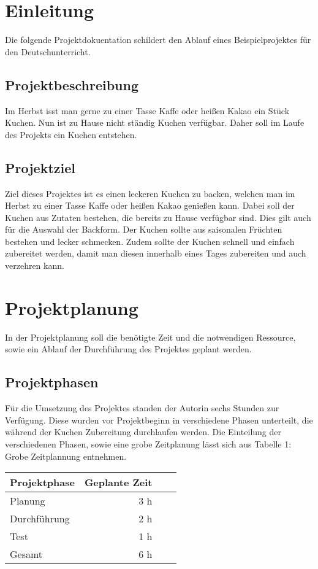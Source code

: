 \section{Einleitung}
Die folgende Projektdokuentation schildert den Ablauf eines Beispielprojektes für den Deutschunterricht.
\subsection{Projektbeschreibung}
Im Herbst isst man gerne zu einer Tasse Kaffe oder heißen Kakao ein Stück Kuchen. Nun ist zu Hause nicht ständig Kuchen verfügbar. Daher soll im Laufe des Projekts
ein Kuchen entstehen.
\subsection{Projektziel}
Ziel dieses Projektes ist es einen leckeren Kuchen zu backen, welchen man im Herbst zu einer Tasse Kaffe oder heißen Kakao genießen kann.
Dabei soll der Kuchen aus Zutaten bestehen, die bereits zu Hause verfügbar sind. Dies gilt auch für die Auswahl der Backform.
Der Kuchen sollte aus saisonalen Früchten bestehen und lecker schmecken. Zudem sollte der Kuchen schnell und einfach zubereitet werden,
damit man diesen innerhalb eines Tages zubereiten und auch verzehren kann.

\section{Projektplanung}
In der Projektplanung soll die benötigte Zeit und die notwendigen Ressource, sowie ein Ablauf der Durchführung 
des Projektes geplant werden.
\subsection{Projektphasen}
Für die Umsetzung des Projektes standen der Autorin sechs Stunden zur Verfügung. Diese wurden vor Projektbeginn in verschiedene Phasen
unterteilt, die während der Kuchen Zubereitung durchlaufen werden. Die Einteilung der verschiedenen Phasen, sowie eine grobe Zeitplanung lässt sich aus Tabelle 1: Grobe Zeitplannung entnehmen.
\begin{center}
    \begin{tabular}{|l*{2}{r}r|}
        \hline
        Projektphase    & Geplante Zeit \\
        \hline
        Planung & 3 h\\
        Durchführung    & 2 h  \\
        Test      & 1 h   \\
        \hline
        Gesamt & 6 h \\
        \hline
        \end{tabular}
\end{center}
